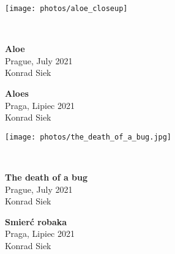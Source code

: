 \documentclass[a4paper,landscape,twoside]{memoir}
\begin{document}
\noindent
\begin{minipage}{.98\linewidth}
\texttt{[image: photos/aloe\_closeup]}
\end{minipage}
\\[\baselineskip]
\begin{minipage}[t]{\linewidth}
\begin{minipage}[t]{.4\linewidth}{\color{\descriptioncolor}
    \textbf{Aloe} \\
    Prague, July 2021 \\
    Konrad Siek
}\end{minipage}
\hfill
\begin{minipage}[t]{.4\linewidth}{\color{\descriptioncolor}
    \textbf{Aloes} \\
    Praga, Lipiec 2021 \\
    Konrad Siek
}\end{minipage}
\end{minipage}

\pagebreak

\noindent
\begin{minipage}{.98\linewidth}
\texttt{[image: photos/the\_death\_of\_a\_bug.jpg]}
\end{minipage}
\\[\baselineskip]
\begin{minipage}[t]{\linewidth}
\begin{minipage}[t]{.4\linewidth}{\color{\descriptioncolor}
    \textbf{The death of a bug} \\
    Prague, July 2021 \\
    Konrad Siek
}\end{minipage}
\hfill
\begin{minipage}[t]{.4\linewidth}{\color{\descriptioncolor}
    \textbf{Smierć robaka} \\
    Praga, Lipiec 2021 \\
    Konrad Siek
}\end{minipage}
\end{minipage}
\end{document}
